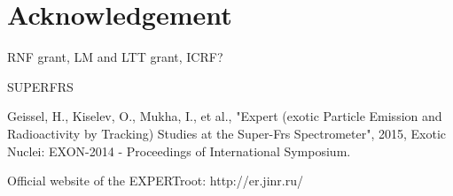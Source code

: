 \documentclass{webofc}
\begin{document}
\section{Acknowledgement}
	
	RNF grant, LM and LTT grant, ICRF?

\begin{thebibliography}{99}
	
	 SUPERFRS
	
	Geissel, H., Kiselev, O., Mukha, I., et al., "Expert (exotic Particle Emission and Radioactivity by Tracking) Studies at the Super-Frs Spectrometer", 2015, Exotic Nuclei: EXON-2014 - Proceedings of International Symposium.
	
	Official website of the EXPERTroot: 
	http://er.jinr.ru/
	
\end{thebibliography}
\end{document}
